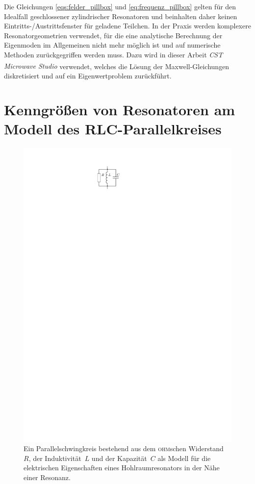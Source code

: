 Die Gleichungen \eqref{eqs:felder_pillbox} und \eqref{eq:frequenz_pillbox} gelten für den Idealfall geschlossener zylindrischer Resonatoren und beinhalten daher keinen Eintritts-/Austrittsfenster für geladene Teilchen.
In der Praxis werden komplexere Resonatorgeometrien verwendet, für die eine analytische Berechnung der Eigenmoden im Allgemeinen nicht mehr möglich ist und auf numerische Methoden zurückgegriffen werden muss.
Dazu wird in dieser Arbeit \emph{CST Microwave Studio\textsuperscript{\textregistered}} verwendet, welches die Lösung der Maxwell-Gleichungen diskretisiert und auf ein Eigenwertproblem zurückführt.


\section{Kenngrößen von Resonatoren am Modell des RLC-Parallelkreises}
\begin{figure}[htb]
  \centering
  \includegraphics[scale=1.4]{./figs/RLC_circuit.pdf}
  \caption{Ein Parallelschwingkreis bestehend aus dem \textsc{ohm}schen Widerstand~$R$, der Induktivität~$L$ und der Kapazität~$C$ als Modell für die elektrischen Eigenschaften eines Hohlraumresonators in der Nähe einer Resonanz.}
  \label{fig:rlc_circuit}
\end{figure}
